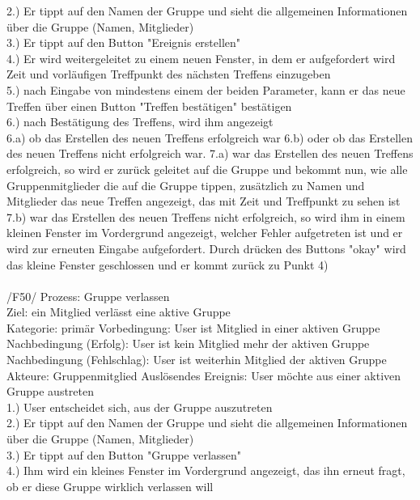2.) Er tippt auf den Namen der Gruppe und sieht die allgemeinen Informationen über die Gruppe (Namen, Mitglieder)\\
3.) Er tippt auf den Button "Ereignis erstellen"\\
4.) Er wird weitergeleitet zu einem neuen Fenster, in dem er aufgefordert wird Zeit und vorläufigen Treffpunkt des nächsten Treffens einzugeben\\
5.) nach Eingabe von mindestens einem der beiden Parameter, kann er das neue Treffen über einen Button "Treffen bestätigen" bestätigen\\
6.) nach Bestätigung des Treffens, wird ihm angezeigt\\
6.a) ob das Erstellen des neuen Treffens erfolgreich war
6.b) oder ob das Erstellen des neuen Treffens nicht erfolgreich war.
7.a) war das Erstellen des neuen Treffens erfolgreich, so wird er zurück geleitet auf die Gruppe und bekommt nun, wie alle Gruppenmitglieder die auf die Gruppe tippen, zusätzlich zu Namen und Mitglieder das neue Treffen angezeigt, das mit Zeit und Treffpunkt zu sehen ist\\
7.b) war das Erstellen des neuen Treffens nicht erfolgreich, so wird ihm in einem kleinen Fenster im Vordergrund angezeigt, welcher Fehler aufgetreten ist und er wird zur erneuten Eingabe aufgefordert. Durch drücken des Buttons "okay" wird das kleine Fenster geschlossen und er kommt zurück zu Punkt 4)\\ \\
/F50/ Prozess: Gruppe verlassen\\
Ziel: ein Mitglied verlässt eine aktive Gruppe\\
Kategorie: primär
Vorbedingung: User ist Mitglied in einer aktiven Gruppe
Nachbedingung (Erfolg): User ist kein Mitglied mehr der aktiven Gruppe\\
Nachbedingung (Fehlschlag): User ist weiterhin Mitglied der aktiven Gruppe\\
Akteure: Gruppenmitglied
Auslösendes Ereignis: User möchte aus einer aktiven Gruppe austreten\\
1.) User entscheidet sich, aus der Gruppe auszutreten\\
2.) Er tippt auf den Namen der Gruppe und sieht die allgemeinen Informationen über die Gruppe (Namen, Mitglieder)\\
3.) Er tippt auf den Button "Gruppe verlassen"\\
4.) Ihm wird ein kleines Fenster im Vordergrund angezeigt, das ihn erneut fragt, ob er diese Gruppe wirklich verlassen will\\
